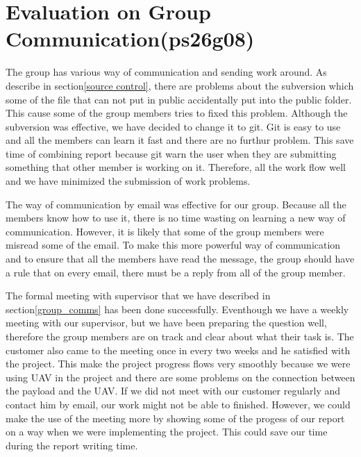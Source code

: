 \section{Evaluation on Group Communication(ps26g08)}
\label{evaluation on group communication}

The group has various way of communication and sending work around.
As describe in section\ref{source control}, there are problems about the subversion which some of the file that can not put in public accidentally put into the public folder.
This cause some of the group members tries to fixed this problem.
Although the subversion was effective, we have decided to change it to git.
Git is easy to use and all the members can learn it fast and there are no furthur problem.
This save time of combining report because git warn the user when they are submitting something that other member is working on it.
Therefore, all the work flow well and we have minimized the submission of work problems.

The way of communication by email was effective for our group.
Because all the members know how to use it, there is no time wasting on learning a new way of communication.
However, it is likely that some of the group members were misread some of the email.
To make this more powerful way of communication and to ensure that all the members have read the message, the group should have a rule that on every email, there must be a reply from all of the group member.

The formal meeting with supervisor that we have described in section\ref{group_comms} has been done successfully. 
Eventhough we have a weekly meeting with our supervisor, but we have been preparing the question well, therefore the group members are on track and clear about what their task is.
The customer also came to the meeting once in every two weeks and he satisfied with the project.
This make the project progress flows very smoothly because we were using UAV in the project and there are some problems on the connection between the payload and the UAV.
If we did not meet with our customer regularly and contact him by email, our work might not be able to finished.
However, we could make the use of the meeting more by showing some of the progess of our report on a way when we were implementing the project.
This could save our time during the report writing time.

